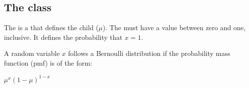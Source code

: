 

\subsection{The  class}
\label{BernoulliDistribution-class}
\label{bernoullidistribution-class}

The \BernoulliDistribution is a \CategoricalUnivariateDistribution that defines the \UncertValue child  ($\mu$).  The  must have a value between zero and one, inclusive.  It defines the probability that $x=1$.

A random variable $ x $ follows a Bernoulli distribution if the probability mass function (pmf) is of the form:

\begin{center}
$\mu^x (1-\mu)^{1-x} $
\end{center}

